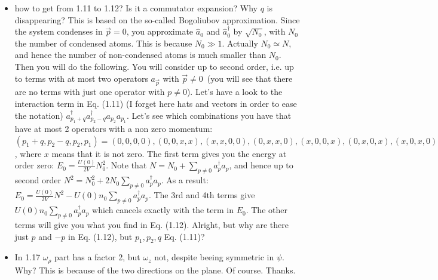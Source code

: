\begin{itemize}
        \item how to get from 1.11 to 1.12? Is it a commutator expansion? Why $q$ is disappearing?
        {\color{red}
            This is based on the so-called Bogoliubov approximation. Since the system condenses in $\vec p=0$, you approximate $\hat a_0$ and $\hat a^\dag_0$ by $\sqrt{N_0}$,
            with $N_0$ the number of condensed atoms.  This is because $N_0\gg 1$. Actually $N_0\simeq N$, and hence the number of non-condensed atoms is much smaller than $N_0$.
            Then you will do the following. You will consider up to second order, i.e. up to terms with at most two operators $a_{\vec p}$ with $\vec p\neq 0$~(you will see that there
            are no terms with just one operator with $p\neq 0$).
            Let's have a look to the interaction term in Eq. (1.11) (I forget here hats and vectors in order to ease the notation) $a^\dag_{p_1+q}a^\dag_{p_2-q}a_{p_2}a_{p_1}$.
            Let's see which combinations you have that have at most 2 operators with a non zero momentum:
            $(p_1+q,p_2-q,p_2,p_1)=(0,0,0,0), (0,0,x,x), (x,x,0,0), (0,x,x,0), (x,0,0,x), (0,x,0,x), (x,0,x,0)$, where $x$ means that it is not zero. The first term gives you the energy at order zero: $E_0=\frac{U(0)}{2V}N_0^2$.
            Note that $N=N_0+\sum_{p\neq 0} a^\dag_pa_p$, and hence up to second order   $N^2=N_0^2+2N_0\sum_{p\neq 0} a^\dag_pa_p$. As a result:
            $E_0=\frac{U(0)}{2V}N^2 - U(0) n_0 \sum_{p\neq 0} a^\dag_pa_p$.
            The 3rd and 4th terms give $U(0) n_0 \sum_{p\neq 0} a^\dag_pa_p$ which cancels exactly with the term in $E_0$.
            The other terms will give you what you find in Eq. (1.12).
        }
        {\color{green}
            Alright, but why are there just $p$ and $-p$ in Eq. (1.12), but $p_{1}, p_{2}, q$ Eq. (1.11)?
        }

        \item In 1.17 $\omega_{\rho}$ part has a factor 2, but $\omega_{z}$ not, despite beeing symmetric in $\psi$. Why?
        {\color{red}
            This is because of the two directions on the plane.
        }
        {\color{green}
            Of course. Thanks.
        }


\end{itemize}
